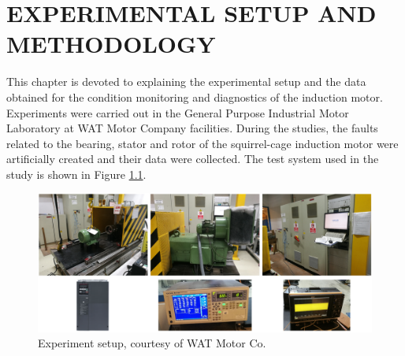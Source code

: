 \chapter{EXPERIMENTAL SETUP AND METHODOLOGY}\label{ch:Ch3}
\vspace*{-12pt} %
This chapter is devoted to explaining the experimental setup and the data obtained for the condition monitoring and diagnostics of the induction motor. Experiments were carried out in the General Purpose Industrial Motor Laboratory at WAT Motor Company facilities. During the studies, the faults related to the bearing, stator and rotor of the squirrel-cage induction motor were artificially created and their data were collected. The test system used in the study is shown in Figure \ref{experiment}.

\begin{figure}[h]
	\centering
	\includegraphics[width=400pt,keepaspectratio=true]{./fig/expsystem.PNG}
	\caption{Experiment setup, courtesy of WAT Motor Co.}	
	\label{experiment}
\end{figure}

